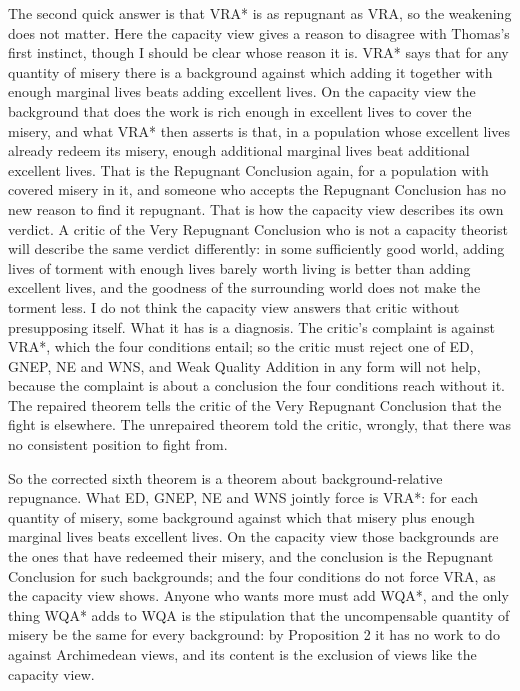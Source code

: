\documentclass[
  11pt,
  letterpaper,
  DIV=11,
  numbers=noendperiod,
  twoside]{scrartcl}
\begin{document}
The second quick answer is that VRA* is as repugnant as VRA, so the
weakening does not matter. Here the capacity view gives a reason to
disagree with Thomas's first instinct, though I should be clear whose
reason it is. VRA* says that for any quantity of misery there is a
background against which adding it together with enough marginal lives
beats adding excellent lives. On the capacity view the background that
does the work is rich enough in excellent lives to cover the misery, and
what VRA* then asserts is that, in a population whose excellent lives
already redeem its misery, enough additional marginal lives beat
additional excellent lives. That is the Repugnant Conclusion again, for
a population with covered misery in it, and someone who accepts the
Repugnant Conclusion has no new reason to find it repugnant. That is how
the capacity view describes its own verdict. A critic of the Very
Repugnant Conclusion who is not a capacity theorist will describe the
same verdict differently: in some sufficiently good world, adding lives
of torment with enough lives barely worth living is better than adding
excellent lives, and the goodness of the surrounding world does not make
the torment less. I do not think the capacity view answers that critic
without presupposing itself. What it has is a diagnosis. The critic's
complaint is against VRA*, which the four conditions entail; so the
critic must reject one of ED, GNEP, NE and WNS, and Weak Quality
Addition in any form will not help, because the complaint is about a
conclusion the four conditions reach without it. The repaired theorem
tells the critic of the Very Repugnant Conclusion that the fight is
elsewhere. The unrepaired theorem told the critic, wrongly, that there
was no consistent position to fight from.

So the corrected sixth theorem is a theorem about background-relative
repugnance. What ED, GNEP, NE and WNS jointly force is VRA*: for each
quantity of misery, some background against which that misery plus
enough marginal lives beats excellent lives. On the capacity view those
backgrounds are the ones that have redeemed their misery, and the
conclusion is the Repugnant Conclusion for such backgrounds; and the
four conditions do not force VRA, as the capacity view shows. Anyone who
wants more must add WQA*, and the only thing WQA* adds to WQA is the
stipulation that the uncompensable quantity of misery be the same for
every background: by Proposition 2 it has no work to do against
Archimedean views, and its content is the exclusion of views like the
capacity view.
\end{document}
